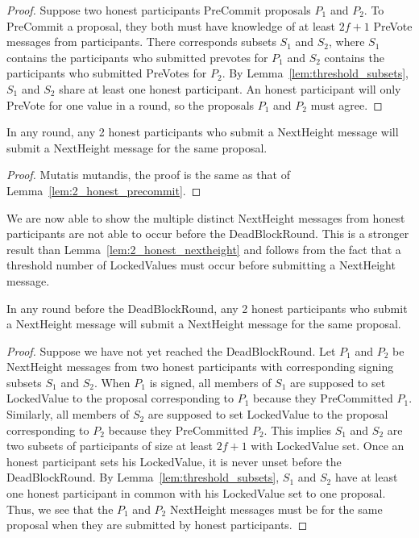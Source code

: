 \begin{proof}
Suppose two honest participants PreCommit proposals $P_{1}$ and $P_{2}$.
To PreCommit a proposal, they both must have knowledge of at least $2f+1$
PreVote messages from participants.
There corresponds subsets $S_{1}$ and $S_{2}$, where $S_{1}$ contains
the participants who submitted prevotes for $P_{1}$ and $S_{2}$ contains
the participants who submitted PreVotes for $P_{2}$.
By Lemma~\ref{lem:threshold_subsets},
$S_{1}$ and $S_{2}$ share at least one honest participant.
An honest participant will only PreVote for one value in a round, so the
proposals $P_{1}$ and $P_{2}$ must agree.
\end{proof}

\begin{lem}
\label{lem:2_honest_nextheight}
In any round, any 2 honest participants who submit a NextHeight message
will submit a NextHeight message for the same proposal.
\end{lem}

\begin{proof}
Mutatis mutandis, the proof is the same as that of
Lemma~\ref{lem:2_honest_precommit}.
\end{proof}

We are now able to show the multiple distinct NextHeight messages from honest
participants are not able to occur before the DeadBlockRound.
This is a stronger result than Lemma~\ref{lem:2_honest_nextheight}
and follows from the fact that a
threshold number of LockedValues must occur before submitting a NextHeight
message.

\begin{lem}
\label{lem:2_distinct_nextheight}
In any round before the DeadBlockRound, any 2 honest participants
who submit a NextHeight message will submit a NextHeight message
for the same proposal.
\end{lem}

\begin{proof}
Suppose we have not yet reached the DeadBlockRound.
Let $P_{1}$ and $P_{2}$ be NextHeight messages from two honest participants
with corresponding signing subsets $S_{1}$ and $S_{2}$.
When $P_{1}$ is signed, all members of $S_{1}$ are supposed to set
LockedValue to the proposal corresponding to $P_{1}$ because they
PreCommitted $P_{1}$.
Similarly, all members of $S_{2}$ are supposed to set LockedValue
to the proposal corresponding to $P_{2}$ because they PreCommitted $P_{2}$.
This implies $S_{1}$ and $S_{2}$ are two subsets of participants of size
at least $2f+1$ with LockedValue set.
Once an honest participant sets his LockedValue, it is never unset before the
DeadBlockRound.
By Lemma~\ref{lem:threshold_subsets},
$S_{1}$ and $S_{2}$ have at least one honest participant in common
with his LockedValue set to one proposal.
Thus, we see that the $P_{1}$ and $P_{2}$ NextHeight messages must be
for the same proposal when they are submitted by honest participants.
\end{proof}

